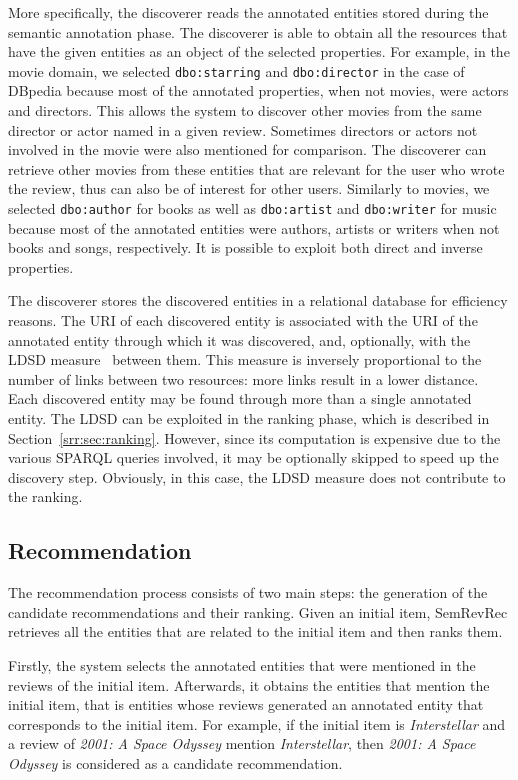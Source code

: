 More specifically, the discoverer reads the annotated entities stored during the semantic annotation phase. The discoverer is able to obtain all the resources that have the given entities as an object of the selected properties. For example, in the movie domain, we selected \texttt{dbo:starring} and \texttt{dbo:director} in the case of DBpedia because most of the annotated properties, when not movies, were actors and directors. This allows the system to discover other movies from the same director or actor named in a given review. Sometimes directors or actors not involved in the movie were also mentioned for comparison. The discoverer can retrieve other movies from these entities that are relevant for the user who wrote the review, thus can also be of interest for other users. Similarly to movies, we selected \texttt{dbo:author} for books as well as \texttt{dbo:artist} and \texttt{dbo:writer} for music because most of the annotated entities were authors, artists or writers when not books and songs, respectively. It is possible to exploit both direct and inverse properties.
 
The discoverer stores the discovered entities in a relational database for efficiency reasons. The URI of each discovered entity is associated with the URI of the annotated entity through which it was discovered, and, optionally, with the LDSD measure~\cite{Passant2010} between them. This measure is inversely proportional to the number of links between two resources: more links result in a lower distance. Each discovered entity may be found through more than a single annotated entity. The LDSD can be exploited in the ranking phase, which is described in Section~\ref{srr:sec:ranking}. However, since its computation is expensive due to the various SPARQL queries involved, it may be optionally skipped to speed up the discovery step. Obviously, in this case, the LDSD measure does not contribute to the ranking.

\subsection{Recommendation}
\label{srr:sec:recommendation}

The recommendation process consists of two main steps: the generation of the candidate recommendations and their ranking. Given an initial item, SemRevRec retrieves all the entities that are related to the initial item and then ranks them.

Firstly, the system selects the annotated entities that were mentioned in the reviews of the initial item. Afterwards, it obtains the entities that mention the initial item, that is entities whose reviews generated an annotated entity that corresponds to the initial item. For example, if the initial item is \emph{Interstellar} and a review of \emph{2001: A Space Odyssey} mention \emph{Interstellar}, then \emph{2001: A Space Odyssey} is considered as a candidate recommendation.

